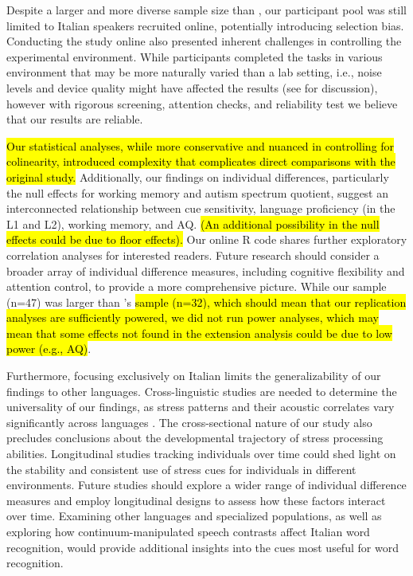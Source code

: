 Despite a larger and more diverse sample size than \cite{Sulpizio_McQueen_2012}, our participant pool was still limited to Italian speakers recruited online, potentially introducing selection bias. Conducting the study online also presented inherent challenges in controlling the experimental environment. While participants completed the tasks in various environment that may be more naturally varied than a lab setting, i.e., noise levels and device quality might have affected the results (see \cite{bramlett_wiener_24-AOW} for discussion), however with rigorous screening, attention checks, and reliability test we believe that our results are reliable.

\hl{Our statistical analyses, while more conservative and nuanced in controlling for colinearity, introduced complexity that complicates direct comparisons with the original study.} Additionally, our findings on individual differences, particularly the null effects for working memory and autism spectrum quotient, suggest an interconnected relationship between cue sensitivity, language proficiency (in the L1 and L2), working memory, and AQ. \hl{(An additional possibility in the null effects could be due to floor effects).}  Our online R code shares further exploratory correlation analyses for interested readers. Future research should consider a broader array of individual difference measures, including cognitive flexibility and attention control, to provide a more comprehensive picture. While our sample (n=47) was larger than \cite{Sulpizio_McQueen_2012}'s \hl{sample (n=32), which should mean that our replication analyses are sufficiently powered, we did not run power analyses, which may mean that some effects not found in the extension analysis could be due to low power (e.g., AQ)}.

Furthermore, focusing exclusively on Italian limits the generalizability of our findings to other languages. Cross-linguistic studies are needed to determine the universality of our findings, as stress patterns and their acoustic correlates vary significantly across languages \cite{cutler2007dutch}. The cross-sectional nature of our study also precludes conclusions about the developmental trajectory of stress processing abilities. Longitudinal studies tracking individuals over time could shed light on the stability and consistent use of stress cues for individuals in different environments. Future studies should explore a wider range of individual difference measures and employ longitudinal designs to assess how these factors interact over time. Examining other languages and specialized populations, as well as exploring how continuum-manipulated speech contrasts affect Italian word recognition, would provide additional insights into the cues most useful for word recognition.

